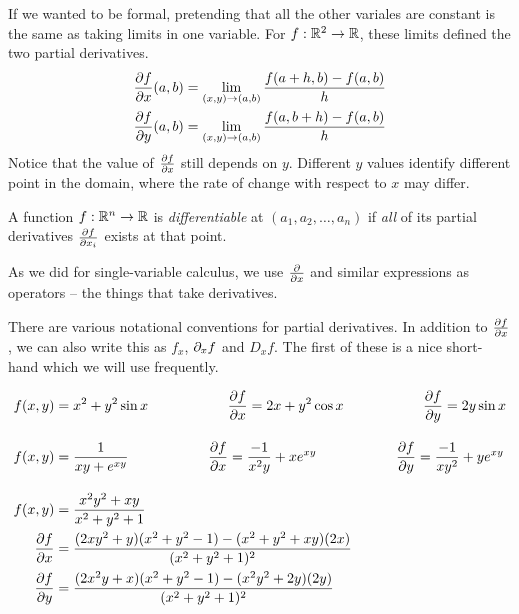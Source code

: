 \documentclass[fleqn,letterpaper]{report}
\begin{document}
If we wanted to be formal, pretending that all the other
variales are constant is the same as taking limits in one
variable.  For $f: \mathbb{R}^2 \rightarrow \mathbb{R}$, these limits
defined the two partial derivatives.
\begin{align*}
\frac{\partial f}{\partial x} (a,b) & = \lim_{(x,y) \rightarrow (a,b)}
\frac{ f(a+h, b) - f(a,b)}{h} \\
\frac{\partial f}{\partial y} (a,b) & = \lim_{(x,y) \rightarrow (a,b)}
\frac{ f(a, b+h) - f(a,b)}{h} \\
\end{align*}
Notice that the value of $\frac{\partial f}{\partial x}$ still depends
on $y$. Different $y$ values identify different point in the
domain, where the rate of change with respect to $x$ may
differ. 

\begin{defn}
A function $f: \mathbb{R}^n \rightarrow \mathbb{R}$ is \emph{differentiable} at
$(a_1, a_2, \ldots, a_n)$ if \emph{all} of its partial
derivatives $\frac{\partial f}{\partial x_i}$ exists at that point.
\end{defn}

As we did for single-variable calculus, we use
$\frac{\partial}{\partial x}$ and similar expressions as operators --
the things that take derivatives.

There are various notational conventions for partial
derivatives. In addition to $\frac{\partial f}{\partial x}$, we can
also write this as $f_x$, $\partial_x f$ and $D_x f$. The first
of these is a nice short-hand which we will use frequently.

\begin{example}
\begin{align*}
f(x,y) & = x^2 + y^2 \sin x \hspace{2cm}
\frac{\partial f}{\partial x} = 2x + y^2 \cos x \hspace{2cm}
\frac{\partial f}{\partial y} = 2y \sin x \\[1em]
f(x,y) & = \frac{1}{xy + e^{xy}} \hspace{2cm}
\frac{\partial f}{\partial x} = \frac{-1}{x^2y} + xe^{xy} \hspace{2cm} 
\frac{\partial f}{\partial y} = \frac{-1}{xy^2} + ye^{xy} 
\\[1em]
f(x,y) & = \frac{x^2y^2+xy}{x^2 + y^2 + 1} \\
\frac{\partial f}{\partial x} & = \frac{(2xy^2+y)(x^2 + y^2 -1 ) -
(x^2 + y^2 + xy)(2x)}{(x^2 + y^2 + 1)^2} \\
\frac{\partial f}{\partial y} & = \frac{(2x^2y + x)(x^2+ y^2 -1 ) -
(x^2 y^2 + 2y)(2y)}{(x^2 + y^2 + 1)^2}
\end{align*}
\end{example}
\end{document}

